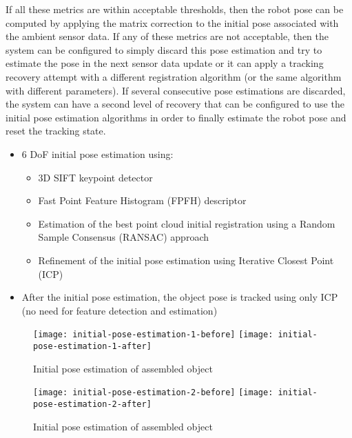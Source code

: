 If all these metrics are within acceptable thresholds, then the robot pose can be computed by applying the matrix correction to the initial pose associated with the ambient sensor data. If any of these metrics are not acceptable, then the system can be configured to simply discard this pose estimation and try to estimate the pose in the next sensor data update or it can apply a tracking recovery attempt with a different registration algorithm (or the same algorithm with different parameters). If several consecutive pose estimations are discarded, the system can have a second level of recovery that can be configured to use the initial pose estimation algorithms in order to finally estimate the robot pose and reset the tracking state.


\begin{itemize}
	\item 6 DoF initial pose estimation using:
	\begin{itemize}
		\item 3D SIFT keypoint detector
		\item Fast Point Feature Histogram (FPFH) descriptor
		\item Estimation of the best point cloud initial registration using a Random Sample Consensus (RANSAC) approach
		\item Refinement of the initial pose estimation using Iterative Closest Point (ICP)
	\end{itemize}
	\item After the initial pose estimation, the object pose is tracked using only ICP (no need for feature detection and estimation)
\end{itemize}

\begin{figure}[!ht]
	\centering
	\texttt{[image: initial-pose-estimation-1-before]}
	\hspace{0.5em}
	\texttt{[image: initial-pose-estimation-1-after]}
	\caption{Initial pose estimation of assembled object}
\end{figure}

\begin{figure}[!ht]
	\centering
	\texttt{[image: initial-pose-estimation-2-before]}
	\hspace{0.5em}
	\texttt{[image: initial-pose-estimation-2-after]}
	\caption{Initial pose estimation of assembled object}
\end{figure}
